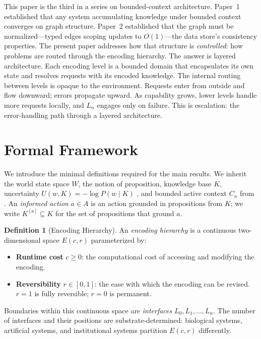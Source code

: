 \documentclass[11pt]{article}
\theoremstyle{definition}
\newtheorem{definition}{Definition}
\begin{document}
This paper is the third in a series on bounded-context architecture.
Paper~1 \cite{McCarthy2026a} established that any system accumulating
knowledge under bounded context converges on graph structure.
Paper~2 \cite{McCarthy2026b} established that the graph must be
normalized---typed edges scoping updates to $O(1)$---the data store's
consistency properties.
The present paper addresses how that structure is \emph{controlled}:
how problems are routed through the encoding hierarchy. The answer is
layered architecture. Each encoding level is a bounded domain that
encapsulates its own state and resolves requests with its encoded
knowledge. The internal routing between levels is opaque to the
environment. Requests enter from outside and flow downward; errors
propagate upward. As capability grows, lower levels handle more
requests locally, and $L_n$ engages only on failure. This is
escalation: the error-handling path through a layered architecture.

\section{Formal Framework}
\label{sec:framework}

We introduce the minimal definitions required for the main results.
We inherit the world state space $W$, the notion of proposition, knowledge base $K$,
uncertainty $U(w,K) = -\log P(w \mid K)$ \cite{Cover2006}, and bounded
active context $C_n$ from \cite{McCarthy2026a}. An \emph{informed
action} $a \in A$ is an action grounded in propositions from $K$; we
write $K^{[a]} \subseteq K$ for the set of propositions that ground $a$.

\begin{definition}[Encoding Hierarchy]
\label{def:hierarchy}
An \emph{encoding hierarchy} is a continuous two-dimensional space
$E(c,r)$ parameterized by:
\begin{itemize}
\item \textbf{Runtime cost} $c \geq 0$: the computational cost of
   accessing and modifying the encoding.
\item \textbf{Reversibility} $r \in [0,1]$: the ease with which the
   encoding can be revised. $r = 1$ is fully reversible; $r = 0$ is
   permanent.
\end{itemize}

Boundaries within this continuous space are \emph{interfaces}
$L_0, L_1, \ldots, L_n$. The number of interfaces and their positions
are substrate-determined: biological systems, artificial systems, and
institutional systems partition $E(c,r)$ differently.
\end{definition}
\end{document}
